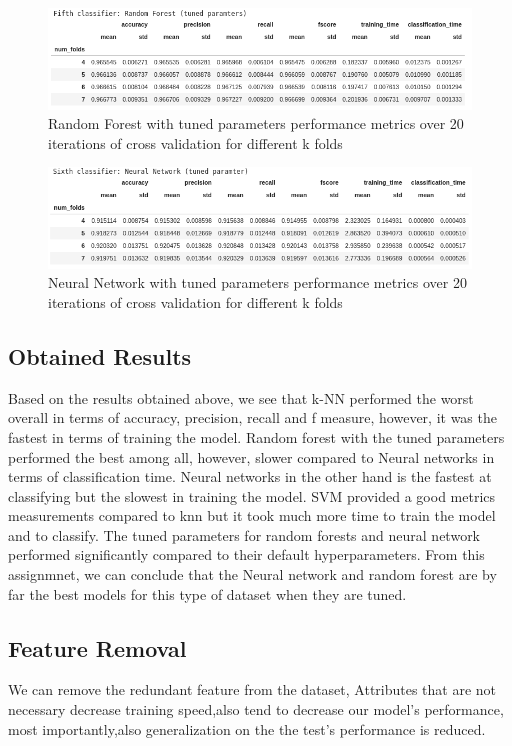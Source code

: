 \begin{figure}[!ht]
 \centering
\includegraphics[width=\textwidth]{assignment2/2-4-run5.png}
\caption{\label{fig:run5} Random Forest with tuned parameters performance metrics over 20 iterations of cross validation for different k folds}
\end{figure}

\begin{figure}[!ht]
 \centering
\includegraphics[width=\textwidth]{assignment2/2-4-run6.png}
\caption{\label{fig:run6} Neural Network with tuned parameters performance metrics over 20 iterations of cross validation for different k folds}
\end{figure}




\subsection{Obtained Results}


Based on the results obtained above, we see that k-NN performed the worst overall in terms of accuracy, precision, recall and f measure, however, it was the fastest in terms of training the model. Random forest with the tuned parameters performed the best among all, however, slower compared to Neural networks in terms of classification time. 
Neural networks in the other hand is the fastest at classifying but the slowest in training the model. SVM provided a good metrics measurements compared to knn but it took much more time to train the model and to classify. The tuned parameters for random forests and neural network performed significantly compared to their default hyperparameters. From this assignmnet, we can conclude that the Neural network and random forest are by far the best models for this type of dataset when they are tuned. 



\subsection{Feature Removal}
We can remove the redundant feature from the dataset, Attributes that are not necessary decrease training speed,also tend to decrease our model's performance, most importantly,also generalization on the the test's performance is reduced.